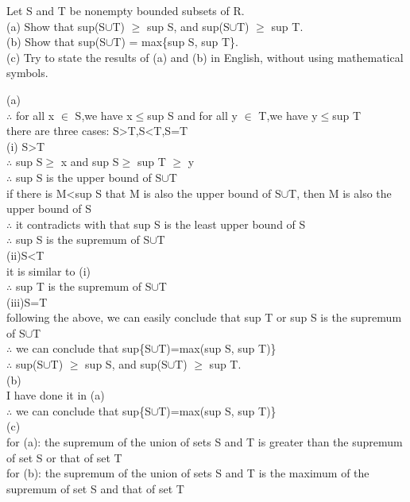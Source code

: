 \documentclass[11pt, a4paper, UTF8]{ctexart}
\begin{document}
\begin{problem}[UD:12.10]
Let S and T be nonempty bounded subsets of R.\\
(a) Show that sup(S$\cup$T) $\ge$ sup S, and  sup(S$\cup$T) $\ge$ sup T.\\
(b) Show that sup(S$\cup$T) = max\{sup S, sup T\}.\\
(c) Try to state the results of (a) and (b) in English, without using mathematical symbols.
\end{problem}
\begin{solution}
(a) \\
$\therefore$ for all x $\in$ S,we have x$\le$sup S and for all y $\in$ T,we have y$\le$sup T\\
there are three cases: S>T,S<T,S=T\\
\indent (i) S>T\\
\indent $\therefore$ sup S$\ge$ x and sup S$\ge$ sup T $\ge$ y\\
\indent $\therefore$ sup S is the upper bound of S$\cup$T\\
\indent if there is M<sup S that M is also the upper bound of S$\cup$T, then M is also the upper bound of S\\
\indent $\therefore$ it contradicts with that sup S is the least upper bound of S\\
\indent $\therefore$ sup S is the supremum of S$\cup$T\\
\indent (ii)S<T\\
\indent it is similar to (i)\\
\indent $\therefore$ sup T is the supremum of S$\cup$T\\
\indent (iii)S=T\\
\indent following the above, we can easily conclude that sup T or sup S is the supremum of S$\cup$T\\
$\therefore$ we can conclude that sup\{S$\cup$T)=max(sup S, sup T)\}\\
$\therefore$ sup(S$\cup$T) $\ge$ sup S, and  sup(S$\cup$T) $\ge$ sup T.\\
(b)\\
I have done it in (a)\\
$\therefore$ we can conclude that sup\{S$\cup$T)=max(sup S, sup T)\}\\
(c)\\
for (a): the supremum of the union of sets S and T is greater than the supremum of set S or that of set T\\
for (b): the supremum of the union of sets S and T is the maximum of the supremum of set S and that of set T\\

\end{solution}
\end{document}
